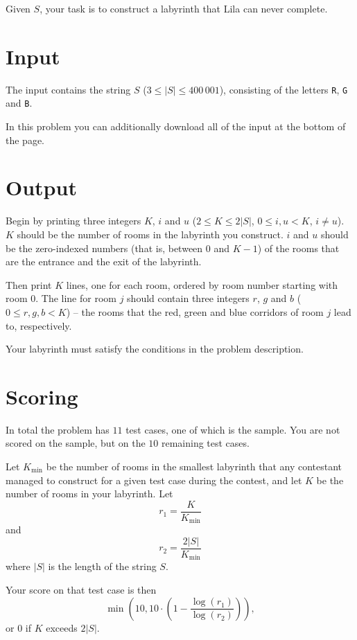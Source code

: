 Given $S$, your task is to construct a labyrinth that Lila can never complete.

\section*{Input}
The input contains the string $S$ ($3 \leq |S| \leq 400\,001$), consisting of the letters \texttt{R}, \texttt{G} and \texttt{B}.

In this problem you can additionally download all of the input at the bottom of the page.

\section*{Output}
Begin by printing three integers $K$, $i$ and $u$ ($2 \leq K \leq 2|S|$, $0 \leq i,u < K$, $i \neq u$).
$K$ should be the number of rooms in the labyrinth you construct.
$i$ and $u$ should be the zero-indexed numbers (that is, between $0$ and $K - 1$) of the rooms that are the entrance and the exit of the labyrinth.

Then print $K$ lines, one for each room, ordered by room number starting with room $0$.
The line for room $j$ should contain three integers $r$, $g$ and $b$ ($0 \leq r,g,b < K$) -- the rooms that the red, green and blue corridors of room $j$ lead to, respectively.

Your labyrinth must satisfy the conditions in the problem description.

\section*{Scoring}
In total the problem has $11$ test cases, one of which is the sample.
You are not scored on the sample, but on the $10$ remaining test cases.

Let $K_{\min}$ be the number of rooms in the smallest labyrinth that any contestant managed to construct for a given test case during the contest, and let $K$ be the number of rooms in your labyrinth.
Let
$$r_1 = \frac{K}{K_{\min}}$$
and
$$r_2 = \frac{2|S|}{K_{\min}}$$
where $|S|$ is the length of the string $S$.

Your score on that test case is then
$$\min\left(10, 10 \cdot \left(1 - \frac{\log(r_1)}{\log(r_2)}\right)\right),$$
or $0$ if $K$ exceeds $2|S|$.
